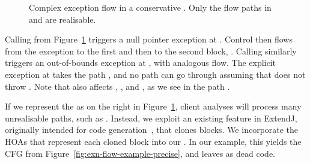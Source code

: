 \begin{figure}[h]
\caption{Complex exception flow in a conservative {\CFG}.  Only the flow paths in  and  are realisable.}
\label{fig:exn-flow-example}
\end{figure}

Calling  from Figure~\ref{fig:exn-flow-example} triggers a null pointer exception at
.  Control then flows
from the exception to the first and then to the second  block,
\succarrow{}\succarrow{}.
Calling  similarly triggers an out-of-bounds exception at
, with analogous flow.
The explicit exception at  takes the path
\succarrow{}\succarrow{}\succarrow{},
and no path can go through  assuming that  does not throw .
Note that  also affects
, , and , as we see in the path
\succarrow{}\succarrow{}.

If we represent the {\CFG} as on the right in Figure~\ref{fig:exn-flow-example}, client analyses will process
many unrealisable paths, such as
\succarrow{}\succarrow{}\succarrow{}.
Instead, we exploit an existing feature in ExtendJ,
originally intended for code generation~\cite{oqvist2018contributions},
that clones  blocks.
We incorporate the HOAs that represent each cloned
block into our {\CFG}.  In our example, this yields the CFG from
Figure~\ref{fig:exn-flow-example-precise}, and leaves  as
dead code.


